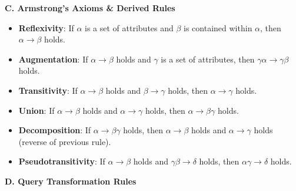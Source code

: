 \documentclass[legalpaper,10pt]{article}
\begin{document}
\textbf{C. Armstrong's Axioms \& Derived Rules}
\vspace{-1em}
\begin{itemize}
\setlength\itemsep{0em}
	\item \textbf{Reflexivity}: If $\alpha$ is a set of attributes and $\beta$ is contained within $\alpha$, then $\alpha \rightarrow \beta$ holds.
	\item \textbf{Augmentation}: If $\alpha \rightarrow \beta$ holds and $\gamma$ is a set of attributes, then $\gamma\alpha \rightarrow \gamma\beta$ holds.
	\item \textbf{Transitivity}: If $\alpha \rightarrow \beta$ holds and $\beta \rightarrow \gamma$ holds, then $\alpha \rightarrow \gamma$ holds.
	\item \textbf{Union}: If $\alpha \rightarrow \beta$ holds and $\alpha \rightarrow \gamma$ holds, then $\alpha \rightarrow \beta\gamma$ holds.
	\item \textbf{Decomposition}: If $\alpha \rightarrow \beta\gamma$ holds, then  $\alpha \rightarrow \beta$ holds and $\alpha \rightarrow \gamma$ holds (reverse of previous rule).
	\item \textbf{Pseudotransitivity}: If $\alpha \rightarrow \beta$ holds and $\gamma\beta \rightarrow \delta$ holds, then $\alpha\gamma \rightarrow \delta$ holds.
\end{itemize}

\textbf{D. Query Transformation Rules}
\end{document}
